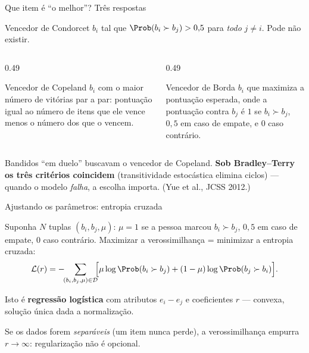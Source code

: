 \documentclass[aspectratio=169, 11pt]{beamer}
\newcommand{\Dset}{\mathcal{D}}
\begin{document}
\begin{frame}[shrink]{Que item é ``o melhor''? Três respostas}

  \begin{defbox}{Vencedor de Condorcet}
    $b_i$ tal que $\Prob(b_i \succ b_j) > 0{,}5$ para \emph{todo} $j \ne i$.
    Pode não existir.
  \end{defbox}

  \begin{columns}[T]
  \begin{column}{0.49\textwidth}
    \begin{defbox}{Vencedor de Copeland}
      $b_i$ com o maior número de vitórias par a par: pontuação igual ao número
      de itens que ele vence menos o número dos que o vencem.
    \end{defbox}
  \end{column}
  \begin{column}{0.49\textwidth}
    \begin{defbox}{Vencedor de Borda}
      $b_i$ que maximiza a pontuação esperada, onde a pontuação contra $b_j$ é
      $1$ se $b_i \succ b_j$, $0{,}5$ em caso de empate, e $0$ caso contrário.
    \end{defbox}
  \end{column}
  \end{columns}

  \begin{ideiabox}
    Bandidos ``em duelo'' buscavam o vencedor de Copeland. \textbf{Sob
    Bradley--Terry os três critérios coincidem} (transitividade estocástica
    elimina ciclos) --- quando o modelo \emph{falha}, a escolha importa.
    {\scriptsize\color{rlCinza}(Yue et al., JCSS 2012.)}
  \end{ideiabox}
\end{frame}

\begin{frame}{Ajustando os parâmetros: entropia cruzada}

  Suponha $N$ tuplas $(b_i, b_j, \mu)$: $\mu = 1$ se a pessoa marcou
  $b_i \succ b_j$, $0{,}5$ em caso de empate, $0$ caso contrário. Maximizar a
  verossimilhança = minimizar a entropia cruzada:
  \[
    \mathcal{L}(r) = -\!\!\sum_{(b_i,b_j,\mu)\in\Dset}\!\!
      \Bigl[\mu \log \Prob(b_i \succ b_j) + (1-\mu)\log \Prob(b_j \succ b_i)\Bigr].
  \]

  \begin{ideiabox}
    Isto é \textbf{regressão logística} com atributos $e_i - e_j$ e
    coeficientes $r$ --- convexa, solução única dada a normalização.
  \end{ideiabox}

  \begin{alertabox}
    Se os dados forem \emph{separáveis} (um item nunca perde), a verossimilhança
    empurra $r \to \infty$: regularização não é opcional.
  \end{alertabox}
\end{frame}
\end{document}
